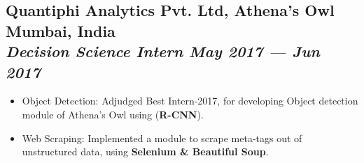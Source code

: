 \documentclass[a4,10pt]{article}
\newcommand{\subtext}[1]{
#1\par\vspace{-0.2cm}}
\newenvironment{zitemize}{
\begin{itemize}\itemsep0pt \parskip0pt \parsep1pt}
{\end{itemize}\vspace{-0.4cm}}
\begin{document}
\subsection*{\large Quantiphi Analytics Pvt. Ltd, Athena's Owl \hfill {\normalsize\normalfont Mumbai, India \\{\textit{\textbf{Decision Science Intern} \hfill May 2017 --- Jun 2017}}}} 
\vspace{0.043cm}
    \begin{zitemize}
        \item Object Detection: Adjudged Best Intern-2017, for developing Object detection module of Athena’s Owl using (\textbf{R-CNN}).
        \item Web Scraping: Implemented a module to scrape meta-tags out of unstructured data, using \textbf{Selenium \& Beautiful Soup}.
    \end{zitemize}

\end{document}
